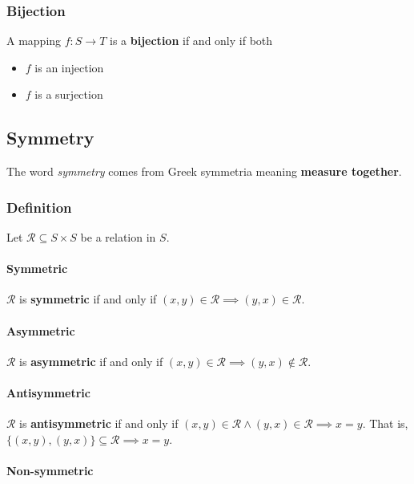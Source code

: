 \subsubsection{Bijection}
\label{sec:bijection}

A mapping $f: S \to T$ is a \textbf{bijection} if and only if both
\begin{itemize}
\item $f$ is an injection
\item $f$ is a surjection
\end{itemize}



\subsection{Symmetry}
\label{sec:symmetry}
The word \textit{symmetry} comes from Greek symmetria meaning
\textbf{measure together}.

\subsubsection{Definition}

Let $\mathcal{R} \subseteq S \times S$ be a relation in $S$.



\paragraph{Symmetric}

$\mathcal{R}$ is \textbf{symmetric} if and only if
$(x, y) \in \mathcal{R} \implies (y, x) \in \mathcal{R}$.

\paragraph{Asymmetric}

$\mathcal{R}$ is \textbf{asymmetric} if and only if
$(x, y) \in \mathcal{R} \implies (y, x) \notin \mathcal{R}$.

\paragraph{Antisymmetric}

$\mathcal{R}$ is \textbf{antisymmetric} if and only if
$ (x,y) \in \mathcal{R} \land (y, x) \in \mathcal{R} \implies x = y $.
That is, $\{(x, y), (y, x) \} \subseteq \mathcal{R} \implies x = y $.

\paragraph{Non-symmetric}

